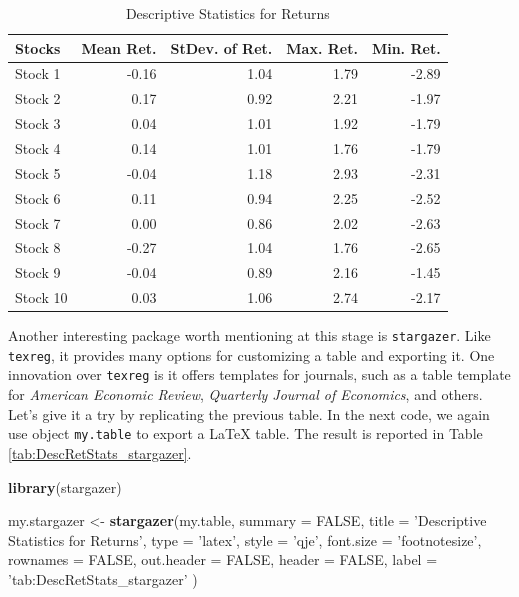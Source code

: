 \documentclass[11pt,]{book}
\newenvironment{Shaded}{\begin{snugshade}}{\end{snugshade}}
\newcommand{\KeywordTok}[1]{\textcolor[rgb]{0.27,0.27,0.27}{\textbf{#1}}}
\newcommand{\DataTypeTok}[1]{\textcolor[rgb]{0.27,0.27,0.27}{#1}}
\newcommand{\StringTok}[1]{\textcolor[rgb]{0.5,0.5,0.5}{#1}}
\newcommand{\OtherTok}[1]{\textcolor[rgb]{0.56,0.35,0.01}{#1}}
\newcommand{\NormalTok}[1]{#1}
\begin{document}
\begin{table}[ht]
\centering
\begingroup\small
\begin{tabular}{lrrrr}
  \hline
Stocks & Mean Ret. & StDev. of Ret. & Max. Ret. & Min. Ret. \\ 
  \hline
Stock 1 & -0.16 & 1.04 & 1.79 & -2.89 \\ 
  Stock 2 & 0.17 & 0.92 & 2.21 & -1.97 \\ 
  Stock 3 & 0.04 & 1.01 & 1.92 & -1.79 \\ 
  Stock 4 & 0.14 & 1.01 & 1.76 & -1.79 \\ 
  Stock 5 & -0.04 & 1.18 & 2.93 & -2.31 \\ 
  Stock 6 & 0.11 & 0.94 & 2.25 & -2.52 \\ 
  Stock 7 & 0.00 & 0.86 & 2.02 & -2.63 \\ 
  Stock 8 & -0.27 & 1.04 & 1.76 & -2.65 \\ 
  Stock 9 & -0.04 & 0.89 & 2.16 & -1.45 \\ 
  Stock 10 & 0.03 & 1.06 & 2.74 & -2.17 \\ 
   \hline
\end{tabular}
\endgroup
\caption{Descriptive Statistics for Returns} 
\label{tab:DescRetStats}
\end{table}

Another interesting package worth mentioning at this stage is
\texttt{stargazer}. Like \texttt{texreg}, it provides many options for
customizing a table and exporting it. One innovation over
\texttt{texreg} is it offers templates for journals, such as a table
template for \emph{American Economic Review}, \emph{Quarterly Journal of
Economics}, and others. Let's give it a try by replicating the previous
table. In the next code, we again use object \texttt{my.table} to export
a LaTeX table. The result is reported in Table
\ref{tab:DescRetStats_stargazer}. 

\begin{Shaded}
\begin{Highlighting}[]
\KeywordTok{library}\NormalTok{(stargazer)}

\NormalTok{my.stargazer <-}\StringTok{ }\KeywordTok{stargazer}\NormalTok{(my.table, }
                          \DataTypeTok{summary =} \OtherTok{FALSE}\NormalTok{, }
                          \DataTypeTok{title =} \StringTok{'Descriptive Statistics for Returns'}\NormalTok{, }
                          \DataTypeTok{type =} \StringTok{'latex'}\NormalTok{, }
                          \DataTypeTok{style =} \StringTok{'qje'}\NormalTok{, }
                          \DataTypeTok{font.size =} \StringTok{'footnotesize'}\NormalTok{, }
                          \DataTypeTok{rownames =} \OtherTok{FALSE}\NormalTok{, }
                          \DataTypeTok{out.header =} \OtherTok{FALSE}\NormalTok{,}
                          \DataTypeTok{header =} \OtherTok{FALSE}\NormalTok{,}
                          \DataTypeTok{label =} \StringTok{'tab:DescRetStats_stargazer'}\NormalTok{ )}
\end{Highlighting}
\end{Shaded}
\end{document}
